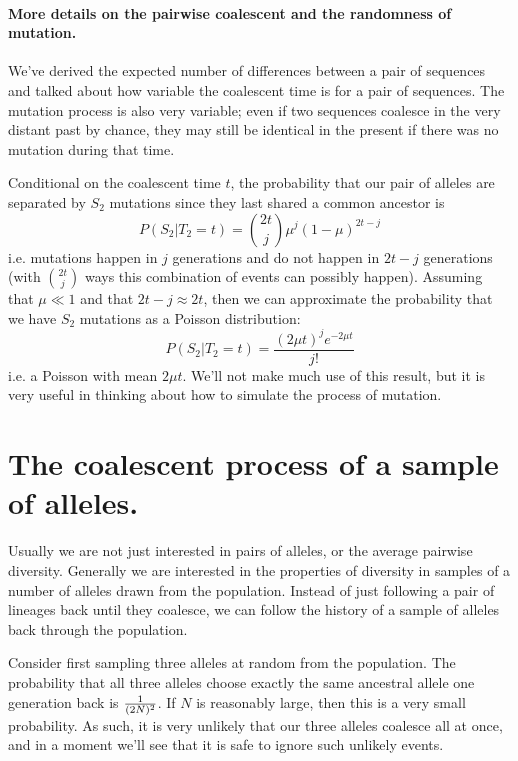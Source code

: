 \paragraph{More details on the pairwise coalescent and the randomness of mutation.}

We've derived the expected number of differences between a pair of sequences and talked about how variable the coalescent time is for a pair of sequences. The mutation process is also very variable; even if two sequences coalesce in the very distant past by chance, they may still be identical in the present if there was no mutation during that time.

Conditional on the coalescent time $t$, the probability that our pair of alleles are separated by $S_2$ mutations since they last shared a common ancestor is
\begin{equation}
P(S_2 | T_2 = t ) = {2t \choose j} \mu^{j} (1-\mu)^{2t-j}
\end{equation}
i.e. mutations happen in $j$ generations and do not happen in $2t-j$
generations (with ${2t \choose j}$ ways this combination of events can possibly
happen). Assuming that $\mu \ll 1$ and that $2t-j \approx 2t$, then we
can approximate the probability that we have $S_2$ mutations as a
Poisson distribution:
\begin{equation}
P(S_2 | T_2 = t ) = \frac{ (2 \mu t )^{j} e^{-2\mu t}}{j!}
\end{equation}
i.e. a Poisson with mean $2\mu t $. We'll not make much use of this result, but it is very useful in thinking about how to simulate the process of mutation.\\

\section{The coalescent process of a sample of alleles.}

Usually we are not just interested in pairs of alleles, or the
average pairwise diversity. Generally we are interested in the properties of
diversity in samples of a number of alleles drawn from the population.
Instead of just following a pair of lineages back until they
coalesce, we can follow the history of a sample of alleles back
through the population.

Consider first sampling three alleles at random from the population. The
probability that all three alleles choose exactly the same ancestral allele one
generation back is $\nicefrac{1}{(2N)^2}$. If $N$ is reasonably large, then this
is a very small probability. As such, it is very unlikely that our three alleles
coalesce all at once, and in a moment we'll see that it is safe to ignore such
unlikely events. \\

